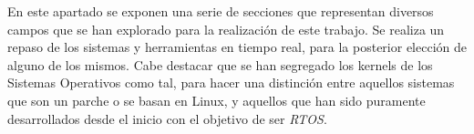 
En este apartado se exponen una serie de secciones que representan diversos campos que se han explorado para la realización de este trabajo. Se realiza un repaso de los sistemas y herramientas en tiempo real, para la posterior elección de alguno de los mismos. Cabe destacar que se han segregado los kernels de los Sistemas Operativos como tal, para hacer una distinción entre aquellos sistemas que son un parche o se basan en Linux, y aquellos que han sido puramente desarrollados desde el inicio con el objetivo de ser \textit{RTOS}.
